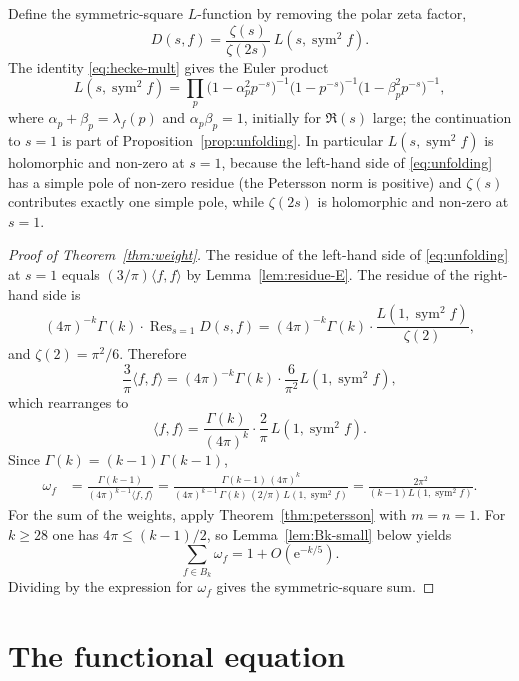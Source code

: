 \documentclass[11pt]{amsart}
\theoremstyle{definition}
\theoremstyle{remark}
\numberwithin{equation}{section}
\DeclareMathOperator{\sym}{sym}
\DeclareMathOperator{\Res}{Res}
\newcommand{\ee}{\mathrm{e}}
\begin{document}
Define the symmetric-square $L$-function by removing the polar zeta factor,
\begin{equation}\label{eq:sym-def}
D(s,f)=\frac{\zeta(s)}{\zeta(2s)}\,L(s,\sym^2 f).
\end{equation}
The identity \eqref{eq:hecke-mult} gives the Euler product
\[
L(s,\sym^2 f)
=\prod_p\bigl(1-\alpha_p^2 p^{-s}\bigr)^{-1}
\bigl(1-p^{-s}\bigr)^{-1}
\bigl(1-\beta_p^2 p^{-s}\bigr)^{-1},
\]
where $\alpha_p+\beta_p=\lambda_f(p)$ and $\alpha_p\beta_p=1$, initially for $\Re(s)$ large; the continuation to $s=1$ is part of Proposition~\ref{prop:unfolding}. In particular $L(s,\sym^2 f)$ is holomorphic and non-zero at $s=1$, because the left-hand side of \eqref{eq:unfolding} has a simple pole of non-zero residue (the Petersson norm is positive) and $\zeta(s)$ contributes exactly one simple pole, while $\zeta(2s)$ is holomorphic and non-zero at $s=1$.

\begin{proof}[Proof of Theorem~\ref{thm:weight}]
The residue of the left-hand side of \eqref{eq:unfolding} at $s=1$ equals $(3/\pi)\langle f,f\rangle$ by Lemma~\ref{lem:residue-E}. The residue of the right-hand side is
\[
(4\pi)^{-k}\Gamma(k)\cdot\Res_{s=1}D(s,f)
=(4\pi)^{-k}\Gamma(k)\cdot\frac{L(1,\sym^2 f)}{\zeta(2)},
\]
and $\zeta(2)=\pi^2/6$. Therefore
\[
\frac{3}{\pi}\langle f,f\rangle
=(4\pi)^{-k}\Gamma(k)\cdot\frac{6}{\pi^2}L(1,\sym^2 f),
\]
which rearranges to
\begin{equation}\label{eq:norm-formula}
\langle f,f\rangle
=\frac{\Gamma(k)}{(4\pi)^k}\cdot\frac{2}{\pi}\,L(1,\sym^2 f).
\end{equation}
Since $\Gamma(k)=(k-1)\Gamma(k-1)$,
\begin{align*}
\omega_f
&=\frac{\Gamma(k-1)}{(4\pi)^{k-1}\langle f,f\rangle}
=\frac{\Gamma(k-1)\,(4\pi)^{k}}{(4\pi)^{k-1}\,\Gamma(k)\,(2/\pi)\,L(1,\sym^2 f)}
=\frac{2\pi^2}{(k-1)L(1,\sym^2 f)}.
\end{align*}
For the sum of the weights, apply Theorem~\ref{thm:petersson} with $m=n=1$. For $k\ge 28$ one has $4\pi\le (k-1)/2$, so Lemma~\ref{lem:Bk-small} below yields
\[
\sum_{f\in B_k}\omega_f=1+O(\ee^{-k/5}).
\]
Dividing by the expression for $\omega_f$ gives the symmetric-square sum.
\end{proof}

\section{The functional equation}
\label{sec:fe}
\end{document}
